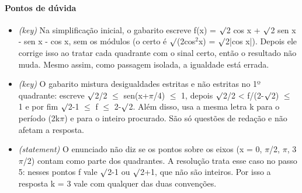 \documentclass{article}%
\begin{document}
\paragraph{Pontos de dúvida}%
\begin{itemize}%
\item%
\textit{(key)} Na simplificação inicial, o gabarito escreve f(x) = $\surd$2 cos x + $\surd$2 sen x - sen x - cos x, sem os módulos (o certo é $\surd$(2cos$^2$x) = $\surd$2|cos x|). Depois ele corrige isso ao tratar cada quadrante com o sinal certo, então o resultado não muda. Mesmo assim, como passagem isolada, a igualdade está errada.%
\item%
\textit{(key)} O gabarito mistura desigualdades estritas e não estritas no 1º quadrante: escreve $\surd$2/2 $\leq$ sen(x+$\pi$/4) $\leq$ 1, depois $\surd$2/2 < f/(2-$\surd$2) $\leq$ 1 e por fim $\surd$2-1 $\leq$ f $\leq$ 2-$\surd$2. Além disso, usa a mesma letra k para o período (2k$\pi$) e para o inteiro procurado. São só questões de redação e não afetam a resposta.%
\item%
\textit{(statement)} O enunciado não diz se os pontos sobre os eixos (x = 0, $\pi$/2, $\pi$, 3$\pi$/2) contam como parte dos quadrantes. A resolução trata esse caso no passo 5: nesses pontos f vale $\surd$2-1 ou $\surd$2+1, que não são inteiros. Por isso a resposta k = 3 vale com qualquer das duas convenções.%
\end{itemize}%
\end{document}
